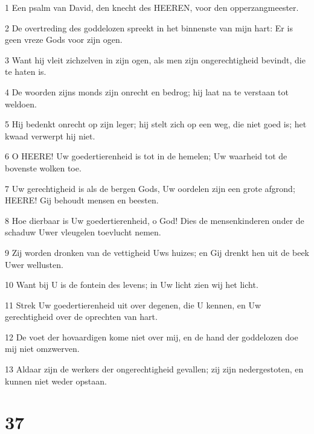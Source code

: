\par 1 Een psalm van David, den knecht des HEEREN, voor den opperzangmeester.
\par 2 De overtreding des goddelozen spreekt in het binnenste van mijn hart: Er is geen vreze Gods voor zijn ogen.
\par 3 Want hij vleit zichzelven in zijn ogen, als men zijn ongerechtigheid bevindt, die te haten is.
\par 4 De woorden zijns monds zijn onrecht en bedrog; hij laat na te verstaan tot weldoen.
\par 5 Hij bedenkt onrecht op zijn leger; hij stelt zich op een weg, die niet goed is; het kwaad verwerpt hij niet.
\par 6 O HEERE! Uw goedertierenheid is tot in de hemelen; Uw waarheid tot de bovenste wolken toe.
\par 7 Uw gerechtigheid is als de bergen Gods, Uw oordelen zijn een grote afgrond; HEERE! Gij behoudt mensen en beesten.
\par 8 Hoe dierbaar is Uw goedertierenheid, o God! Dies de mensenkinderen onder de schaduw Uwer vleugelen toevlucht nemen.
\par 9 Zij worden dronken van de vettigheid Uws huizes; en Gij drenkt hen uit de beek Uwer wellusten.
\par 10 Want bij U is de fontein des levens; in Uw licht zien wij het licht.
\par 11 Strek Uw goedertierenheid uit over degenen, die U kennen, en Uw gerechtigheid over de oprechten van hart.
\par 12 De voet der hovaardigen kome niet over mij, en de hand der goddelozen doe mij niet omzwerven.
\par 13 Aldaar zijn de werkers der ongerechtigheid gevallen; zij zijn nedergestoten, en kunnen niet weder opstaan.

\chapter{37}

